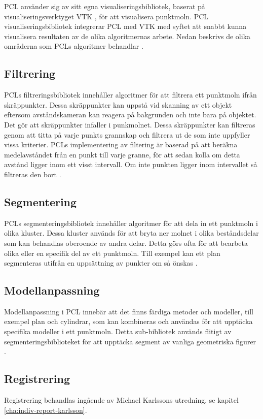 PCL använder sig av sitt egna visualiseringsbibliotek, baserat på visualiseringsverktyget VTK \cite{VTK_book}, för att visualisera punktmoln. PCL visualiseringsbibliotek integrerar PCL med VTK med syftet att snabbt kunna visualisera resultaten av de olika algoritmernas arbete. Nedan beskrivs de olika områderna som PCLs algoritmer behandlar \cite{rusu20113d}.

\subsection{Filtrering}
PCLs filtreringsbibliotek innehåller algoritmer för att filtrera ett punktmoln ifrån skräppunkter. Dessa skräppunkter kan uppstå vid skanning av ett objekt eftersom avståndskameran kan reagera på bakgrunden och inte bara på objektet. Det gör att skräppunkter infaller i punkmolnet. Dessa skräppunkter kan filtreras genom att titta på varje punkts grannskap och filtrera ut de som inte uppfyller vissa kriterier. PCLs implementering av filtering är baserad på att beräkna medelavståndet från en punkt till varje granne, för att sedan kolla om detta avstånd ligger inom ett visst intervall. Om inte punkten ligger inom intervallet så filtreras den bort \cite{pcl_filtering}. 
 
\subsection{Segmentering}
PCLs segmenteringsbibliotek innehåller algoritmer för att dela in ett punktmoln i olika kluster. Dessa kluster används för att bryta ner molnet i olika beståndsdelar som kan behandlas oberoende av andra delar. Detta görs ofta för att bearbeta olika eller en specifik del av ett punktmoln. Till exempel kan ett plan segmenteras utifrån en uppsättning av punkter om så önskas \cite{pcl_segmentation}. 
 
\subsection{Modellanpassning}
Modellanpassning i PCL innebär att det finns färdiga metoder och modeller, till exempel plan och cylindrar, som kan kombineras och användas för att upptäcka specifika modeller i ett punktmoln. Detta sub-bibliotek används flitigt av segmenteringsbiblioteket för att upptäcka segment av vanliga geometriska figurer \cite{pcl_model_fitting}.

\subsection{Registrering}
Registrering behandlas ingående av Michael Karlssons utredning, se kapitel \ref{cha:indiv-report-karlsson}.

